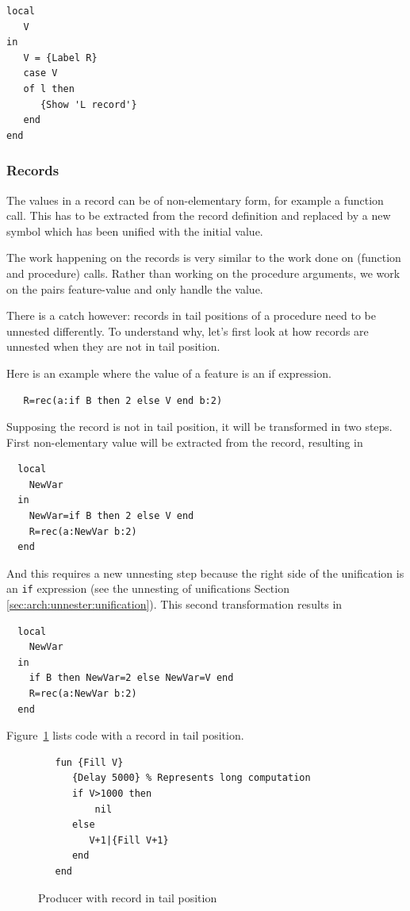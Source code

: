 \documentclass[a4paper]{memoir}
\begin{document}
\begin{lstlisting}
local
   V
in
   V = {Label R}
   case V 
   of l then
      {Show 'L record'}
   end
end
\end{lstlisting}
   

\subsubsection{Records}\label{sec:arch:unnester:records}
The values in a record can be of non-elementary form, for example a function call. This has to be extracted from the record definition and replaced by a new symbol which has been unified with the initial value. 

The work happening on the records is very similar to the work done on (function and procedure) calls. Rather than working on the procedure arguments, we work on the pairs feature-value and only handle the value. 

There is a catch however: records in tail positions of a procedure need to be unnested
differently. To understand why, let's first look at how records are unnested
when they are not in tail position.

Here is an example where the value of a feature is an if expression.
\begin{lstlisting}
   R=rec(a:if B then 2 else V end b:2)
\end{lstlisting}
Supposing the record is not in tail position, it will be transformed in two steps.
First non-elementary value will be extracted from the record, resulting in 
\begin{lstlisting}
  local
    NewVar
  in
    NewVar=if B then 2 else V end
    R=rec(a:NewVar b:2)
  end
\end{lstlisting}
And this requires a new unnesting step because the right side of the unification is an \lstinline!if! expression (see the unnesting of unifications Section \ref{sec:arch:unnester:unification}).
\pagebreak[4]
This second transformation results in 
\begin{lstlisting}
  local
    NewVar
  in
    if B then NewVar=2 else NewVar=V end
    R=rec(a:NewVar b:2)
  end
\end{lstlisting}


Figure~\ref{fig:unnester:fill_tail} lists code with a record in tail position.

\begin{figure}[h]
\begin{lstlisting}
   fun {Fill V}
      {Delay 5000} % Represents long computation
      if V>1000 then
	      nil
      else
         V+1|{Fill V+1}
      end
   end
\end{lstlisting}
\caption{Producer with record in tail position}
\label{fig:unnester:fill_tail}
\end{figure}
\end{document}
